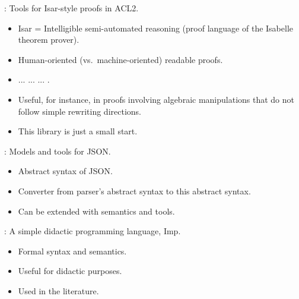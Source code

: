 
\begin{frame}

\newlibtitle

:
Tools for Isar-style proofs in ACL2.
\begin{itemize}
\item Isar = Intelligible semi-automated reasoning
      (proof language of the Isabelle theorem prover).
\item Human-oriented (vs.\ machine-oriented) readable proofs.
\item {} ...  ...  ... .
\item Useful, for instance, in proofs involving algebraic manipulations
      that do not follow simple rewriting directions.
\item This library is just a small start.
\end{itemize}

\end{frame}


\begin{frame}

\newlibtitle

:
Models and tools for JSON.
\begin{itemize}
\item Abstract syntax of JSON.
\item Converter from parser's abstract syntax to this abstract syntax.
\item Can be extended with semantics and tools.
\end{itemize}

\end{frame}


\begin{frame}

\newlibtitle

:
A simple didactic programming language, Imp.
\begin{itemize}
\item Formal syntax and semantics.
\item Useful for didactic purposes.
\item Used in the literature.
\end{itemize}

\end{frame}

